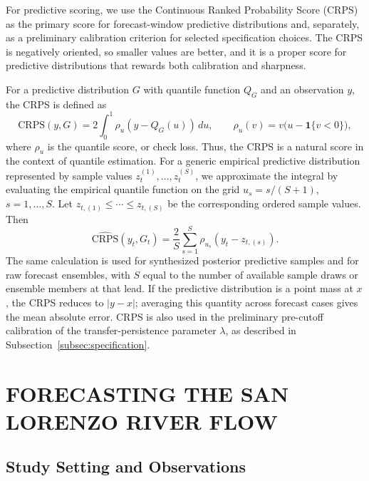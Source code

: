 \documentclass[APA,STIX1COL]{WileyNJD-v2}
\begin{document}
For predictive scoring, we use the Continuous Ranked Probability Score (CRPS) \citep{gneiting2007strictly} as the primary score for forecast-window predictive distributions and, separately, as a preliminary calibration criterion for selected specification choices. The CRPS is negatively oriented, so smaller values are better, and it is a proper score for predictive distributions that rewards both calibration and sharpness.

For a predictive distribution \(G\) with quantile function \(Q_G\) and an observation \(y\), the CRPS is defined as
\[
\text{CRPS}(y, G) = 2 \int_0^1 \rho_u\!\left(y - Q_G(u)\right)\, du,
\qquad
\rho_u(v) = v\big(u - \mathbf{1}\{v<0\}\big),
\]
where \(\rho_u\) is the quantile score, or check loss. Thus, the CRPS is a natural score in the context of quantile estimation. For a generic empirical predictive distribution represented by sample values \(z_t^{(1)},\ldots,z_t^{(S)}\), we approximate the integral by evaluating the empirical quantile function on the grid \(u_s=s/(S+1)\), \(s=1,\ldots,S\). Let \(z_{t,(1)} \leq \cdots \leq z_{t,(S)}\) be the corresponding ordered sample values. Then
\[
\widehat{\mathrm{CRPS}}(y_t,G_t)
= \frac{2}{S}\sum_{s=1}^S
\rho_{u_s}\!\left(y_t-z_{t,(s)}\right).
\]
The same calculation is used for synthesized posterior predictive samples and for raw forecast ensembles, with \(S\) equal to the number of available sample draws or ensemble members at that lead. If the predictive distribution is a point mass at \(x\), the CRPS reduces to \(|y-x|\); averaging this quantity across forecast cases gives the mean absolute error. CRPS is also used in the preliminary pre-cutoff calibration of the transfer-persistence parameter \(\lambda\), as described in Subsection~\ref{subsec:specification}.


\section{FORECASTING THE SAN LORENZO RIVER FLOW}
\label{sec:data}

\subsection{Study Setting and Observations}
\end{document}
